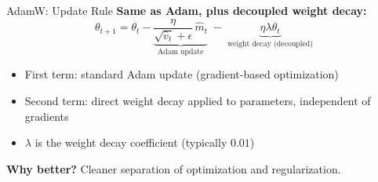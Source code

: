 \begin{frame}{AdamW: Update Rule}
\textbf{Same as Adam, plus decoupled weight decay:}
\[
\theta_{t+1} = \theta_t - \underbrace{\frac{\eta}{\sqrt{\hat v_t} + \epsilon} \, \hat m_t}_{\text{Adam update}} \; - \; \underbrace{\eta \lambda \theta_t}_{\text{weight decay (decoupled)}}
\]

\begin{itemize}
\item First term: standard Adam update (gradient-based optimization)
\item Second term: direct weight decay applied to parameters, independent of gradients
\item $\lambda$ is the weight decay coefficient (typically $0.01$)
\end{itemize}

\textbf{Why better?} Cleaner separation of optimization and regularization.

\end{frame}


